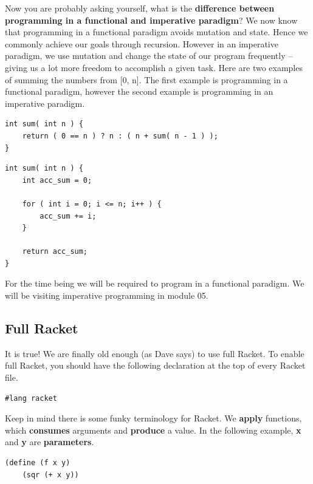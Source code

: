\documentclass[12pt,extarticle]{article}
\begin{document}
Now you are probably asking yourself, what is the \textbf{difference between programming in a functional and imperative paradigm}? We now know that programming in a functional paradigm avoids mutation and state. Hence we commonly achieve our goals through recursion. However in an imperative paradigm, we use mutation and change the state of our program frequently -- giving us a lot more freedom to accomplish a given task. Here are two examples of summing the numbers from [0, n]. The first example is programming in a functional paradigm, however the second example is programming in an imperative paradigm.\\

\lstset {
	language=C
}
\begin{lstlisting}
int sum( int n ) {
	return ( 0 == n ) ? n : ( n + sum( n - 1 ) );
}
\end{lstlisting}

\lstset {
	language=C
}
\begin{lstlisting}
int sum( int n ) {
	int acc_sum = 0;
	
	for ( int i = 0; i <= n; i++ ) {
		acc_sum += i;
	}
	
	return acc_sum;
}
\end{lstlisting}

For the time being we will be required to program in a functional paradigm. We will be visiting imperative programming in module 05.

\subsection{Full Racket}

It is true! We are finally old enough (as Dave says) to use full Racket. To enable full Racket, you should have the following declaration at the top of every Racket file.\\

\lstset {
	language=Lisp
}
\begin{lstlisting}
#lang racket
\end{lstlisting}

Keep in mind there is some funky terminology for Racket. We \textbf{apply} functions, which \textbf{consumes} arguments and \textbf{produce} a value. In the following example, \textbf{x} and \textbf{y} are \textbf{parameters}.\\

\lstset {
	language=Lisp
}
\begin{lstlisting}
(define (f x y)
	(sqr (+ x y))
\end{lstlisting}
\end{document}
